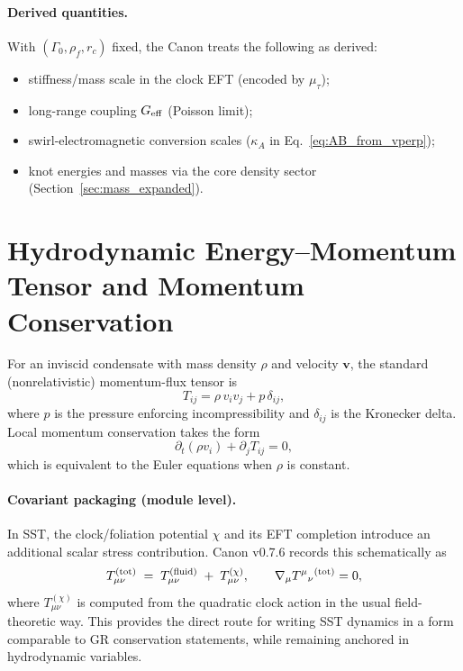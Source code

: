 \documentclass[10pt]{article}
\begin{document}
\paragraph{Derived quantities.}
With $(\Gamma_0,\rho_{\!f},r_c)$ fixed, the Canon treats the following as derived:
\begin{itemize}
    \item stiffness/mass scale in the clock EFT (encoded by $\mu_\tau$);
    \item long-range coupling $G_{\rm eff}$ (Poisson limit);
    \item swirl-electromagnetic conversion scales ($\kappa_A$ in
    Eq.~\eqref{eq:AB_from_vperp});
    \item knot energies and masses via the core density sector
    (Section~\ref{sec:mass_expanded}).
\end{itemize}

    \section{Hydrodynamic Energy--Momentum Tensor and Momentum Conservation}
    \label{app:stress_tensor}

For an inviscid condensate with mass density $\rho$ and velocity $\mathbf{v}$,
the standard (nonrelativistic) momentum-flux tensor is
\begin{equation}
    T_{ij} = \rho\,v_i v_j + p\,\delta_{ij},
    \label{eq:stress_tensor_basic}
\end{equation}
where $p$ is the pressure enforcing incompressibility and $\delta_{ij}$ is the
Kronecker delta. Local momentum conservation takes the form
\begin{equation}
    \partial_t(\rho v_i) + \partial_j T_{ij} = 0,
\end{equation}
which is equivalent to the Euler equations when $\rho$ is constant.

\paragraph{Covariant packaging (module level).}
In SST, the clock/foliation potential $\chi$ and its EFT completion introduce an
additional scalar stress contribution. Canon v0.7.6 records this schematically as
\begin{equation}
    T_{\mu\nu}^{\rm (tot)} \;=\; T_{\mu\nu}^{\rm (fluid)} \;+\; T_{\mu\nu}^{(\chi)},
    \qquad
    \nabla_\mu T^{\mu}{}_{\nu}{}^{\rm (tot)}=0,
\end{equation}
where $T_{\mu\nu}^{(\chi)}$ is computed from the quadratic clock action in the usual
field-theoretic way. This provides the direct route for writing SST dynamics in a
form comparable to GR conservation statements, while remaining anchored in
hydrodynamic variables.
\end{document}
